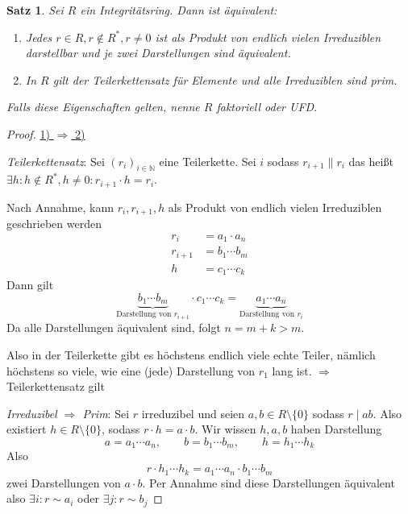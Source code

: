 \documentclass[a4paper,12pt,numbers=noenddot,parskip=full]{scrartcl}
\newcommand{\setN}{\mathbb{N}}
\newcommand{\heading}{\underline}
\theoremstyle{dotless}
\newtheorem{theorem}{Satz}[section]
\theoremstyle{remark}
\begin{document}
	\begin{theorem}
		Sei $R$ ein Integritätsring. Dann ist äquivalent:
		\begin{enumerate}
			\item Jedes $r \in R, r \notin R^*, r \neq 0$ ist als Produkt von endlich vielen Irreduziblen darstellbar und je zwei Darstellungen sind äquivalent.
			\item In $R$ gilt der Teilerkettensatz für Elemente und alle Irreduziblen sind prim.
		\end{enumerate}
		Falls diese Eigenschaften gelten, nenne $R$ faktoriell oder UFD.
	\end{theorem}

	\begin{proof}
		\heading{1) $\Rightarrow$ 2)}
		
		\textit{Teilerkettensatz}: Sei $(r_i)_{i \in \setN}$ eine Teilerkette. Sei $i$ sodass $r_{i+1} \parallel r_i$ das heißt $\exists h: h \notin R^*, h \neq 0: r_{i+1} \cdot h = r_i$.
		
		Nach Annahme, kann $r_i, r_{i+1},h$ als Produkt von endlich vielen Irreduziblen geschrieben werden
		\begin{align*}
			r_i &= a_1 \cdot a_n \\
			r_{i+1} &= b_1 \cdots b_m \\
			h &= c_1 \cdots c_k
		\end{align*}
		Dann gilt
		\begin{equation*}
			\underbrace{b_1 \cdots b_m}_\text{Darstellung von $r_{i+1}$} \cdot c_1 \cdots c_k = \underbrace{a_1 \cdots a_n}_\text{Darstellung von $r_i$}
		\end{equation*}
		Da alle Darstellungen äquivalent sind, folgt $n = m + k > m$.
		
		Also in der Teilerkette gibt es höchstens endlich viele echte Teiler, nämlich höchstens so viele, wie eine (jede) Darstellung von $r_1$ lang ist. $\Rightarrow$ Teilerkettensatz gilt
		
		\textit{Irreduzibel $\Rightarrow$ Prim}: Sei $r$ irreduzibel und seien $a,b \in R \setminus \{ 0 \}$ sodass $r \mid ab$. Also existiert $h \in R \setminus \{ 0 \}$, sodass $r \cdot h = a \cdot b$. Wir wissen $h,a,b$ haben Darstellung
		\begin{equation*}
			a = a_1 \cdots a_n, \qquad b = b_1 \cdots b_m, \qquad h = h_1 \cdots h_k
		\end{equation*}
		Also
		\begin{equation*}
			r \cdot h_1 \cdots h_k = a_1 \cdots a_n \cdot b_1 \cdots b_m
		\end{equation*}
		zwei Darstellungen von $a \cdot b$. Per Annahme sind diese Darstellungen äquivalent also $\exists i: r \sim a_i$ oder $\exists j: r \sim b_j$
		

\end{proof}
\end{document}

